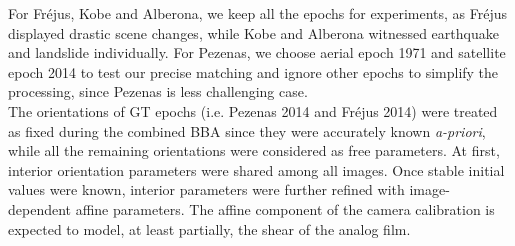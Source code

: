 For Fr{\'e}jus, Kobe and Alberona, we keep all the epochs for experiments, as Fr{\'e}jus displayed drastic scene changes, while Kobe and Alberona witnessed earthquake and landslide individually. For Pezenas, we choose aerial epoch 1971 and satellite epoch 2014 to test our precise matching and ignore other epochs to simplify the processing, since Pezenas is less challenging case.\\
The orientations of \ac{GT} epochs (i.e. Pezenas 2014 and Fr{\'e}jus 2014) were treated as fixed during the combined \ac{BBA} since they were accurately known \textit{a-priori}, while all the remaining orientations were considered as free parameters. At first, {interior orientation parameters} were shared among all images. Once stable initial values were known, interior parameters were further refined with image-dependent affine parameters. The affine component of the camera calibration is expected to model, at least partially, the shear of the analog film.\\

